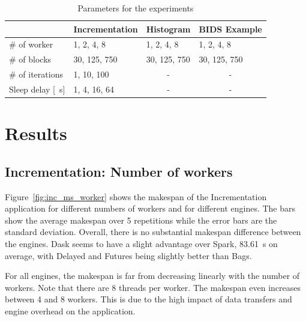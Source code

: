\documentclass[conference]{IEEEtran}
\begin{document}

\begin{table}[!t]
    \renewcommand{\arraystretch}{1.3}
    \caption{Parameters for the experiments}\label{tab:param}
    \centering
    \begin{tabular*}{\columnwidth}{llll}
    \hline
                        & Incrementation & Histogram             & BIDS Example          \\ \hline
    \# of worker        & 1, 2, 4, 8     & 1, 2, 4, 8            & 1, 2, 4, 8            \\
    \# of blocks        & 30, 125, 750   & 30, 125, 750          & 30, 125, 750          \\
    \# of iterations    & 1, 10, 100     & \multicolumn{1}{c}{-} & \multicolumn{1}{c}{-} \\
    Sleep delay {[}\SI{}{\second}{]} & 1, 4, 16, 64   & \multicolumn{1}{c}{-} & \multicolumn{1}{c}{-} \\ \hline
    \end{tabular*}
    \end{table}






\section{Results}

\subsection{Incrementation: Number of workers}
Figure~\ref{fig:inc_ms_worker} shows the makespan of the Incrementation application
for different numbers of workers and for different engines. The bars show the average
makespan over 5 repetitions while the error bars are the standard deviation. Overall,
there is no substantial makespan difference between the engines. Dask seems to have a
slight advantage over Spark, \SI{83.61}{\second} on average,
with Delayed and Futures being slightly better than Bags.

For all engines, the makespan is far from decreasing linearly with the
number of workers. Note that there are 8 threads per worker. The makespan
even increases between 4 and 8 workers. This is due to the high impact of
data transfers and engine overhead on the application. 
\end{document}
